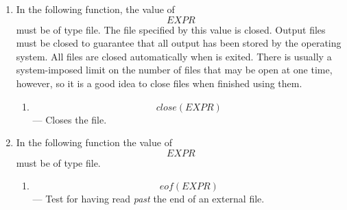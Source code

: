 {\begin{enumerate}
\begin{enumerate}
\item
\[openr(EXPR)\] --- 
If the file named by the value of \[EXPR\] exists,
then it is opened for reading, and the value of the function 
is of type file.
If the file named by the value of \[EXPR\] does not exist,
then the value of the function is \[OM\]\@.

A special case is the file named \["CONSOLE"\].
Opening \["CONSOLE"\] for reading provides a way to read from the
console, even if you are currently reading from an include file.
If you have directed \[stdin\] from a file, it may read from that file
or it may read from the console; this is  machine dependent.

\item
\[openw(EXPR)\] ---  
If the file named by the value of \[EXPR\] does not exist,
then it is created by the operating system externally to \ISETL{}\@.
This file is opened for writing from the beginning,
so that anything previously in the file is destroyed.
The value of the function is of type file.

\item
\[opena(EXPR)\] ---  The same as \[openw(EXPR)\],
except that if the file exists
its contents are not destroyed.
Anything that is written is added to the end of the file.
\end{enumerate}


\item
In the following function, the value of 
\[EXPR\] must be of type file.  The
file specified by this value is closed.  Output files must be closed to
guarantee that all output has been stored by the operating system.  All
files are closed automatically when \ISETL{} is exited.
There is usually a system-imposed limit on the number of files
that may be open at one time, however, so it is a good idea to close files
when finished using them.

\begin{enumerate}
\item
\[close(EXPR)\] ---  Closes the file.
\end{enumerate}


\item
In the following function the value of \[EXPR\]  must be of type file.

\begin{enumerate}

\item
\[eof(EXPR)\] ---  Test for having read {\em past}
the end of an external file.
\end{enumerate}
\end{enumerate}



}
